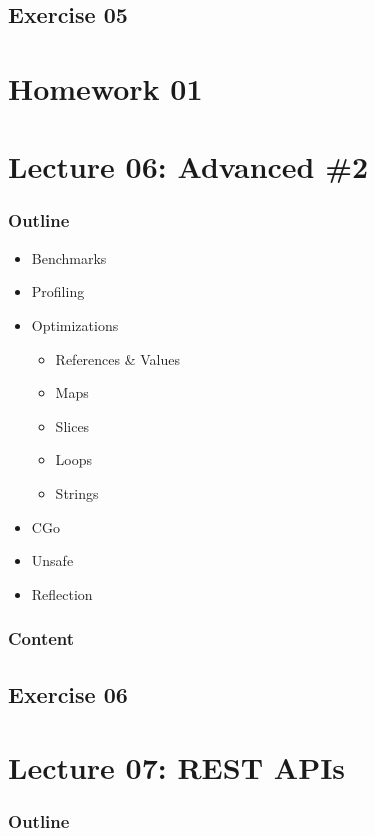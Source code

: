 \documentclass[
  digital,
  color,
  oneside,
  nosansbold,
  nocolorbold,
  lof,
  lot,
]{fithesis4}
\begin{document}
\subsection{Exercise 05}

\section{Homework 01}

\section{Lecture 06: Advanced \#2}

\subsubsection{Outline}

\begin{itemize}
    \item Benchmarks
    \item Profiling
    \item Optimizations
    \begin{itemize}
        \item References \& Values
        \item Maps
        \item Slices
        \item Loops
        \item Strings
    \end{itemize}
    \item CGo
    \item Unsafe
    \item Reflection
\end{itemize}

\subsubsection{Content}

\subsection{Exercise 06}

\section{Lecture 07: REST APIs}

\subsubsection{Outline}
\end{document}
